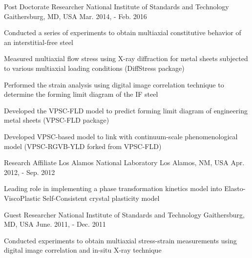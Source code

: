 \begin{cventries}
  \cventry
  {Post Doctorate Researcher} %
  {National Institute of Standards and Technology} %
  {Gaithersburg, MD, USA} %
  {Mar. 2014, - Feb. 2016} %
  {
    \begin{cvitems} %
    \item {Conducted a series of experiments to obtain multiaxial constitutive behavior of an interstitial-free steel}
    \item {Measured multiaxial flow stress using X-ray diffraction for metal sheets subjected to various multiaxial loading conditions (DiffStress package)}
    \item {Performed the strain analysis using digital image correlation technique to determine the forming limit diagram of the IF steel}
    \item {Developed the VPSC-FLD model to predict forming limit diagram of engineering metal sheets (VPSC-FLD package)}
    \item {Developed VPSC-based model to link with continuum-scale phenomenological model (VPSC-RGVB-YLD forked from VPSC-FLD)}
    \end{cvitems}
  }

  \cventry
  {Research Affiliate} %
  {Los Alamos National Laboratory} %
  {Los Alamos, NM, USA} %
  {Apr. 2012, - Sep. 2012} %
  {
    \begin{cvitems} %
      {Leading role in implementing a phase transformation kinetics model into Elasto-ViscoPlastic Self-Consistent crystal plasticity model}
    \end{cvitems}
  }

  \cventry
  {Guest Researcher} %
  {National Institute of Standards and Technology} %
  {Gaithersburg, MD, USA} %
  {June. 2011, - Dec. 2011} %
  {
    \begin{cvitems} %
      {Conducted experiments to obtain multiaxial stress-strain measurements using digital image correlation and in-situ X-ray technique}
    \end{cvitems}
  }



\end{cventries}
